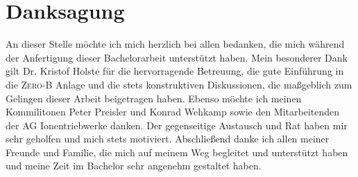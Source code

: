 \chapter*{Danksagung}
An dieser Stelle möchte ich mich herzlich bei allen bedanken, die mich während der Anfertigung dieser Bachelorarbeit unterstützt haben. Mein besonderer Dank gilt Dr. Kristof Holste für die hervorragende Betreuung, die gute Einführung in die \textsc{Zero-B} Anlage und die stets konstruktiven Diskussionen, die maßgeblich zum Gelingen dieser Arbeit beigetragen haben. Ebenso möchte ich meinen Kommilitonen Peter Preisler und Konrad Wehkamp sowie den Mitarbeitenden der AG Ionentriebwerke danken. Der gegenseitige Austausch und Rat haben mir sehr geholfen und mich stets motiviert. Abschließend danke ich allen meiner Freunde und Familie, die mich auf meinem Weg begleitet und unterstützt haben und meine Zeit im Bachelor sehr angenehm gestaltet haben.